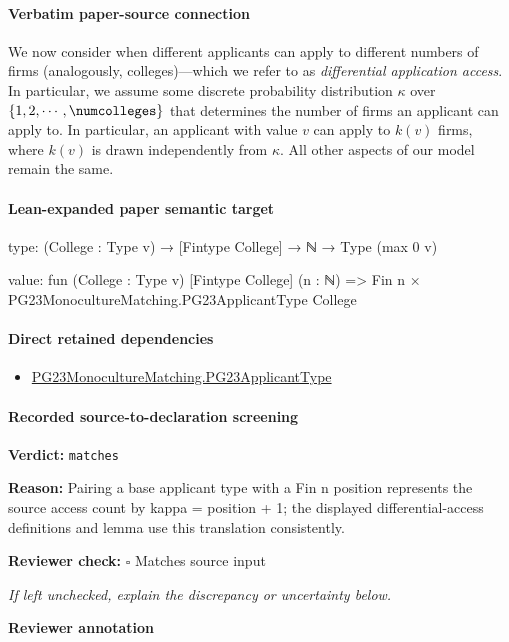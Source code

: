 \documentclass[10pt]{article}
\newcommand{\reviewerbox}{%
  \par\noindent\fbox{\parbox{0.96\linewidth}{\rule{0pt}{0.38in}}}\par
}
\newcommand{\reviewmatch}[1]{%
  \par\noindent\textbf{Reviewer check:} $\square$\; #1\par
  \noindent\emph{If left unchecked, explain the discrepancy or uncertainty below.}\par
}
\begin{document}
\paragraph{Verbatim paper-source connection}
\begin{ReviewVerbatim}
We now consider when different applicants can apply to different numbers of firms (analogously, colleges)---which we refer to as \textit{differential application access}. In particular, we assume some discrete probability distribution $\kappa$ over $\{1, 2, \cdots, \numcolleges\}$ that determines the number of firms an applicant can apply to. In particular, an applicant with value $v$ can apply to $k(v)$ firms, where $k(v)$ is drawn independently from $\kappa$. All other aspects of our model remain the same.
\end{ReviewVerbatim}



\paragraph{Lean-expanded paper semantic target}
\begin{ReviewVerbatim}
type:
(College : Type v) → [Fintype College] → ℕ → Type (max 0 v)

value:
fun (College : Type v) [Fintype College] (n : ℕ) => Fin n × PG23MonocultureMatching.PG23ApplicantType College
\end{ReviewVerbatim}

\paragraph{Direct retained dependencies}
\begin{itemize}\raggedright
\item \hyperlink{paper-prerequisite-40ad59c353cf95ec}{PG23\allowbreak{}Monoculture\allowbreak{}Matching.\allowbreak{}PG23\allowbreak{}Applicant\allowbreak{}Type}
\end{itemize}
\paragraph{Recorded source-to-declaration screening}
\textbf{Verdict:} \texttt{matches}
\\
{\raggedright
\textbf{Reason:} Pairing a base applicant type with a Fin n position represents the source access count by kappa = position + 1;\allowbreak{} the displayed differential-\allowbreak{}access definitions and lemma use this translation consistently.\allowbreak{}
\par}
\reviewmatch{Matches source input}
\noindent\textbf{Reviewer annotation}\par
\reviewerbox
\clearpage
\hypertarget{paper-prerequisite-6458c12e2da75e1b}{}
\end{document}
